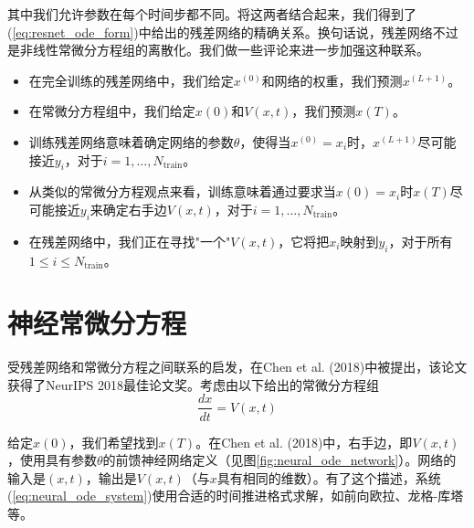 其中我们允许参数在每个时间步都不同。将这两者结合起来，我们得到了(\ref{eq:resnet_ode_form})中给出的残差网络的精确关系。换句话说，残差网络不过是非线性常微分方程组的离散化。我们做一些评论来进一步加强这种联系。

\begin{itemize}
\item 在完全训练的残差网络中，我们给定$x^{(0)}$和网络的权重，我们预测$x^{(L+1)}$。

\item 在常微分方程组中，我们给定$x(0)$和$V(x, t)$，我们预测$x(T)$。

\item 训练残差网络意味着确定网络的参数$\theta$，使得当$x^{(0)} = x_i$时，$x^{(L+1)}$尽可能接近$y_i$，对于$i = 1, \ldots, N_{\text{train}}$。

\item 从类似的常微分方程观点来看，训练意味着通过要求当$x(0) = x_i$时$x(T)$尽可能接近$y_i$来确定右手边$V(x, t)$，对于$i = 1, \ldots, N_{\text{train}}$。

\item 在残差网络中，我们正在寻找"一个"$V(x, t)$，它将把$x_i$映射到$y_i$，对于所有$1 \leq i \leq N_{\text{train}}$。
\end{itemize}

\section{神经常微分方程}
\label{sec:neural_odes}

受残差网络和常微分方程之间联系的启发，在Chen et al. (2018)中被提出，该论文获得了NeurIPS 2018最佳论文奖。考虑由以下给出的常微分方程组
\begin{equation}
\frac{dx}{dt} = V(x, t)
\label{eq:neural_ode_system}
\end{equation}

给定$x(0)$，我们希望找到$x(T)$。在Chen et al. (2018)中，右手边，即$V(x, t)$，使用具有参数$\theta$的前馈神经网络定义（见图\ref{fig:neural_ode_network}）。网络的输入是$(x, t)$，输出是$V(x, t)$（与$x$具有相同的维数）。有了这个描述，系统(\ref{eq:neural_ode_system})使用合适的时间推进格式求解，如前向欧拉、龙格-库塔等。

